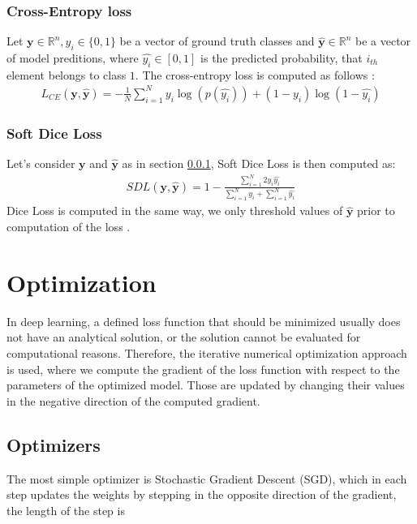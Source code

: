 \subsubsection{Cross-Entropy loss}
\label{sec:cross_entropy}
Let $\mathbf{y} \in \mathbb{R}^n, y_i \in \{ 0, 1 \}$ be a vector of ground truth classes and $\hat{\mathbf{y}} \in \mathbb{R}^n$ be a vector of model preditions, where $\hat{y_i} \in [0, 1]$ is the predicted probability, that $i_{th}$ element belongs to class $1$. The cross-entropy loss is computed as follows \cite{Jadon2020}:
\begin{align}
    L_{CE}(\mathbf{y}, \hat{\mathbf{y}}) = - \frac{1}{N} \sum_{i=1}^N y_i \log (p(\hat{y_i})) + (1 - y_i) \log (1 - \hat{y_i})
\end{align}

\subsubsection{Soft Dice Loss}
Let's consider $\mathbf{y}$ and $\hat{\mathbf{y}}$ as in section \ref{sec:cross_entropy}, Soft Dice Loss is then computed as:
\begin{align}
    SDL(\mathbf{y}, \hat{\mathbf{y}}) = 1 - \frac{\sum_{i=1}^N 2y_i \hat{y_i}}{\sum_{i=1}^N y_i + \sum_{i=1}^N \hat{y_i}}
\end{align}
Dice Loss is computed in the same way, we only threshold values of $\hat{\mathbf{y}}$ prior to computation of the loss \cite{Softdiceloss,Jadon2020}.

\section{Optimization}
In deep learning, a defined loss function that should be minimized usually does not have an analytical solution, or the solution cannot be evaluated for computational reasons. Therefore, the iterative numerical optimization approach is used, where we compute the gradient of the loss function with respect to the parameters of the optimized model. Those are updated by changing their values in the negative direction of the computed gradient.
\subsection{Optimizers}
The most simple optimizer is Stochastic Gradient Descent (SGD), which in each step updates the weights by stepping in the opposite direction of the gradient, the length of the step is

